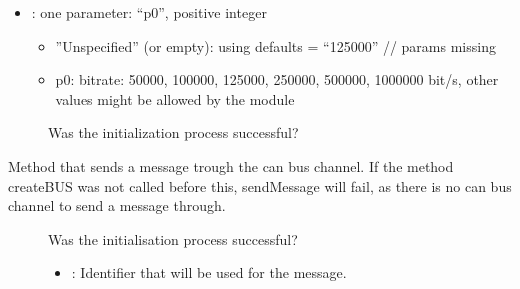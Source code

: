 \documentclass[letterpaper,10pt,english]{sphinxmanual}
\begin{document}
\begin{fulllineitems}
\begin{fulllineitems}
\begin{description}
\begin{itemize}
\begin{itemize}
\end{itemize}


\item {} 
: one parameter: “p0”, positive integer\begin{itemize}
\item {} 
”Unspecified” (or empty): using defaults = “125000” // params missing

\item {} 
p0: bitrate: 50000, 100000, 125000, 250000, 500000, 1000000 bit/s, other values might be allowed by the module

\end{itemize}


\end{itemize}

\end{description}


\begin{description}
\item[{}] \leavevmode
Was the initialization process successful? 

\end{description}


\end{fulllineitems}


\begin{fulllineitems}
\label{\detokenize{vendors/peak:_CPPv4N12CSockCanScan11sendMessageEshPhb}}%
\pysigstartmultiline
{}\label{\detokenize{vendors/peak:classCSockCanScan_1a485ec8621a98cdacad8e27433e09d919}}%
\pysigstopmultiline
Method that sends a message trough the can bus channel. If the method createBUS was not called before this, sendMessage will fail, as there is no can bus channel to send a message through.

\begin{description}
\item[{}] \leavevmode
Was the initialisation process successful? 

\item[{}] \leavevmode\begin{itemize}
\item {} 
: Identifier that will be used for the message. 


\end{itemize}
\end{description}
\end{fulllineitems}
\end{fulllineitems}
\end{document}
